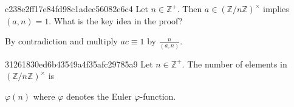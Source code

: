 \begin{note}{c238e2ff17e84fd98c1adec56082e6c4}
    Let \({ n \in \mathbb Z^{+} }\).
    Then \({ a \in (\mathbb Z / n\mathbb Z)^{\times} }\) implies \({ (a, n) = 1 }\).
    What is the key idea in the proof?

    \begin{cloze}{1}
        By contradiction and multiply \({ ac \equiv 1 }\) by \({ \frac{n}{(a, n)} }\).
    \end{cloze}
\end{note}

\begin{note}{31261830ed6b43549a4f35afc29785a9}
    Let \({ n \in \mathbb Z^{+} }\).
    The number of elements in \({ (\mathbb Z / n\mathbb Z)^{\times} }\) is \begin{icloze}{1}\({ \varphi(n) }\) where \({ \varphi }\) denotes the Euler \({ \varphi }\)-function.\end{icloze}
\end{note}


